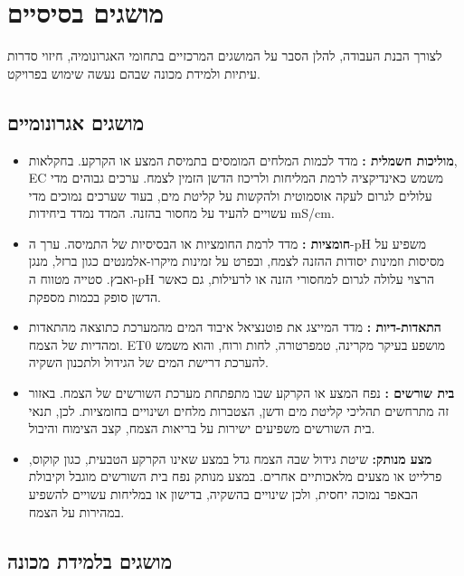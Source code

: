 \section{מושגים בסיסיים}
לצורך הבנת העבודה, להלן הסבר על המושגים המרכזיים בתחומי האגרונומיה, חיזוי סדרות עיתיות ולמידת מכונה שבהם נעשה שימוש בפרויקט.

\subsection{מושגים אגרונומיים}

\begin{itemize}
\item \textbf{\color{ruppinblue}מוליכות חשמלית :} מדד לכמות המלחים המומסים בתמיסת המצע או הקרקע. בחקלאות, EC משמש כאינדיקציה לרמת המליחות ולריכוז הדשן הזמין לצמח. ערכים גבוהים מדי עלולים לגרום לעקה אוסמוטית ולהקשות על קליטת מים, בעוד שערכים נמוכים מדי עשויים להעיד על מחסור בהזנה. המדד נמדד ביחידות mS/cm.

\item \textbf{\color{ruppinblue}חומציות :} מדד לרמת החומציות או הבסיסיות של התמיסה. ערך ה-pH משפיע על מסיסות וזמינות יסודות ההזנה לצמח, ובפרט על זמינות מיקרו-אלמנטים כגון ברזל, מנגן ואבץ. סטייה מטווח ה-pH הרצוי עלולה לגרום למחסורי הזנה או לרעילות, גם כאשר הדשן סופק בכמות מספקת.

\item \textbf{\color{ruppinblue}התאדות-דיות :} מדד המייצג את פוטנציאל איבוד המים מהמערכת כתוצאה מהתאדות ומהדיות של הצמח. ET0 מושפע בעיקר מקרינה, טמפרטורה, לחות ורוח, והוא משמש להערכת דרישת המים של הגידול ולתכנון השקיה.

\item \textbf{\color{ruppinblue}בית שורשים :} נפח המצע או הקרקע שבו מתפתחת מערכת השורשים של הצמח. באזור זה מתרחשים תהליכי קליטת מים ודשן, הצטברות מלחים ושינויים בחומציות. לכן, תנאי בית השורשים משפיעים ישירות על בריאות הצמח, קצב הצימוח והיבול.

\item \textbf{\color{ruppinblue}מצע מנותק:} שיטת גידול שבה הצמח גדל במצע שאינו הקרקע הטבעית, כגון קוקוס, פרלייט או מצעים מלאכותיים אחרים. במצע מנותק נפח בית השורשים מוגבל וקיבולת הבאפר נמוכה יחסית, ולכן שינויים בהשקיה, בדישון או במליחות עשויים להשפיע במהירות על הצמח.
\end{itemize}

\subsection{מושגים בלמידת מכונה}

